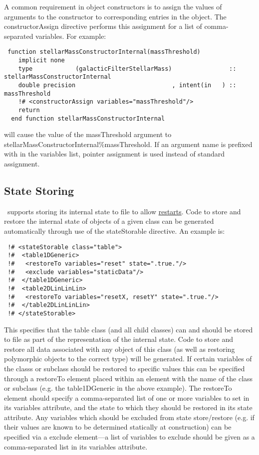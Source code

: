 A common requirement in object constructors is to assign the values of arguments to the constructor to corresponding entries in the object. The {\normalfont \ttfamily constructorAssign} directive performs this assignment for a list of comma-separated variables. For example:
\begin{lstlisting}  
 function stellarMassConstructorInternal(massThreshold)
    implicit none
    type            (galacticFilterStellarMass)                :: stellarMassConstructorInternal
    double precision                           , intent(in   ) :: massThreshold
    !# <constructorAssign variables="massThreshold"/>
    return
  end function stellarMassConstructorInternal
\end{lstlisting}
will cause the value of the {\normalfont \ttfamily massThreshold} argument to {\normalfont \ttfamily stellarMassConstructorInternal\%massThreshold}. If an argument name is prefixed with {\normalfont \ttfamily \textasteriskcentered} in the variables list, pointer assignment is used instead of standard assignment.

\subsection{State Storing}

\glc\ supports storing its internal state to file to allow \href{https://github.com/galacticusorg/galacticus/releases/download/masterRelease/Galacticus_Usage.pdf\#sec.Restarting}{restarts}. Code to store and restore the internal state of objects of a given class can be generated automatically through use of the {\normalfont \ttfamily stateStorable} directive. An example is:
\begin{verbatim}
 !# <stateStorable class="table">
 !#  <table1DGeneric>
 !#   <restoreTo variables="reset" state=".true."/>
 !#   <exclude variables="staticData"/>
 !#  </table1DGeneric>
 !#  <table2DLinLinLin>
 !#   <restoreTo variables="resetX, resetY" state=".true."/>
 !#  </table2DLinLinLin>  
 !# </stateStorable>
\end{verbatim}
This specifies that the {\normalfont \ttfamily table} class (and all child classes) can and should be stored to file as part of the representation of the internal state. Code to store and restore all data associated with any object of this class (as well as restoring polymorphic objects to the correct type) will be generated. If certain variables of the classs or subclass should be restored to specific values this can be specified through a {\normalfont \ttfamily restoreTo} element placed within an element with the name of the class or subclass (e.g. the {\normalfont \ttfamily table1DGeneric} in the above example). The {\normalfont \ttfamily restoreTo} element should specify a comma-separated list of one or more variables to set in its {\normalfont \ttfamily variables} attribute, and the state to which they should be restored in its {\normalfont \ttfamily state} attribute. Any variables which should be excluded from state store/restore (e.g. if their values are known to be determined statically at construction) can be specified via a {\normalfont \ttfamily exclude} element---a list of variables to exclude should be given as a comma-separated list in its {\normalfont \ttfamily variables} attribute.


